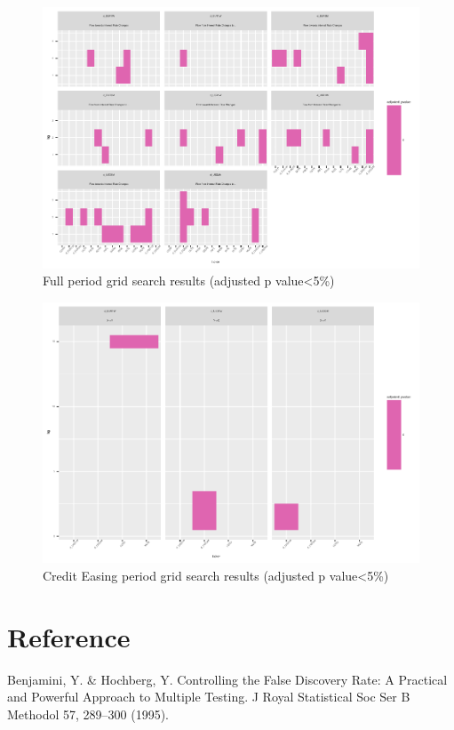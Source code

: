 \documentclass[
]{article}
\begin{document}
\begin{figure}
\centering
\includegraphics{working_paper_files/figure-latex/fullless6-1.pdf}
\caption{Full period grid search results (adjusted p value\textless5\%)}
\end{figure}

\begin{figure}
\centering
\includegraphics{working_paper_files/figure-latex/CE7-1.pdf}
\caption{Credit Easing period grid search results (adjusted p
value\textless5\%)}
\end{figure}

\hypertarget{reference}{%
\section{Reference}\label{reference}}

Benjamini, Y. \& Hochberg, Y. Controlling the False Discovery Rate: A
Practical and Powerful Approach to Multiple Testing. J Royal Statistical
Soc Ser B Methodol 57, 289--300 (1995).
\end{document}
